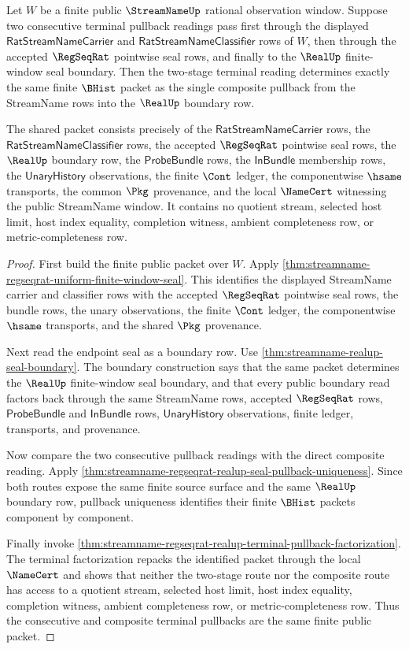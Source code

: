 \begin{theorem}
\label{thm:streamname-regseqrat-realup-composite-terminal-pullback}
Let $W$ be a finite public $\StreamNameUp$ rational observation window. Suppose
two consecutive terminal pullback readings pass first through the displayed
$\mathsf{RatStreamNameCarrier}$ and $\mathsf{RatStreamNameClassifier}$ rows of
$W$, then through the accepted $\RegSeqRat$ pointwise seal rows, and finally to
the $\RealUp$ finite-window seal boundary. Then the two-stage terminal reading
determines exactly the same finite $\BHist$ packet as the single composite
pullback from the StreamName rows into the $\RealUp$ boundary row.

The shared packet consists precisely of the
$\mathsf{RatStreamNameCarrier}$ rows, the
$\mathsf{RatStreamNameClassifier}$ rows, the accepted $\RegSeqRat$ pointwise
seal rows, the $\RealUp$ boundary row, the $\mathsf{ProbeBundle}$ rows, the
$\mathsf{InBundle}$ membership rows, the $\mathsf{UnaryHistory}$ observations,
the finite $\Cont$ ledger, the componentwise $\hsame$ transports, the common
$\Pkg$ provenance, and the local $\NameCert$ witnessing the public StreamName
window. It contains no quotient stream, selected host limit, host index
equality, completion witness, ambient completeness row, or metric-completeness
row.
\end{theorem}
\begin{proof}
First build the finite public packet over $W$. Apply
\autoref{thm:streamname-regseqrat-uniform-finite-window-seal}. This identifies
the displayed StreamName carrier and classifier rows with the accepted
$\RegSeqRat$ pointwise seal rows, the bundle rows, the unary observations, the
finite $\Cont$ ledger, the componentwise $\hsame$ transports, and the shared
$\Pkg$ provenance.

Next read the endpoint seal as a boundary row. Use
\autoref{thm:streamname-realup-seal-boundary}. The boundary construction says
that the same packet determines the $\RealUp$ finite-window seal boundary, and
that every public boundary read factors back through the same StreamName rows,
accepted $\RegSeqRat$ rows, $\mathsf{ProbeBundle}$ and $\mathsf{InBundle}$
rows, $\mathsf{UnaryHistory}$ observations, finite ledger, transports, and
provenance.

Now compare the two consecutive pullback readings with the direct composite
reading. Apply
\autoref{thm:streamname-regseqrat-realup-seal-pullback-uniqueness}. Since both
routes expose the same finite source surface and the same $\RealUp$ boundary
row, pullback uniqueness identifies their finite $\BHist$ packets component by
component.

Finally invoke
\autoref{thm:streamname-regseqrat-realup-terminal-pullback-factorization}. The
terminal factorization repacks the identified packet through the local
$\NameCert$ and shows that neither the two-stage route nor the composite route
has access to a quotient stream, selected host limit, host index equality,
completion witness, ambient completeness row, or metric-completeness row. Thus
the consecutive and composite terminal pullbacks are the same finite public
packet.
\end{proof}

